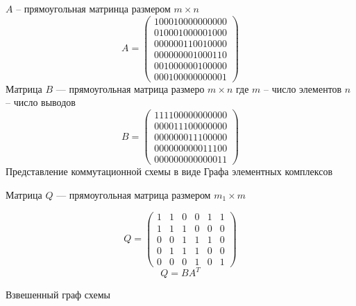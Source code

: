 \documentclass{article}
\begin{document}
	$A$ -- прямоугольная матринца размером $m \times n$
	$$
	A =
	\begin{pmatrix}
		1 0 0 0 1 0 0 0 0 0 0 0 0 0 0\\
		0 1 0 0 0 1 0 0 0 0 0 1 0 0 0\\
		0 0 0 0 0 0 1 1 0 0 1 0 0 0 0\\
		0 0 0 0 0 0 0 0 1 0 0 0 1 1 0\\
		0 0 1 0 0 0 0 0 0 1 0 0 0 0 0\\
		0 0 0 1 0 0 0 0 0 0 0 0 0 0 1
	\end{pmatrix}
	$$
	Матрица $B$ --- прямоугольная матрица размеро $m \times n$ где $m$ -- число элементов $n$ -- число выводов
	$$
	B =
	\begin{pmatrix}
		1 1 1 1 0 0 0 0 0 0 0 0 0 0 0\\
		0 0 0 0 1 1 1 0 0 0 0 0 0 0 0\\
		0 0 0 0 0 0 0 1 1 1 0 0 0 0 0\\
		0 0 0 0 0 0 0 0 0 0 1 1 1 0 0\\
		0 0 0 0 0 0 0 0 0 0 0 0 0 1 1
	\end{pmatrix}
	$$
	Представление коммутационной схемы в виде Графа элементных комплексов

	Матрица $Q$ --- прямоугольная матрица размером $m_1 \times m$

	$$
	Q =
	\begin{pmatrix}
		1 & 1 & 0 & 0 & 1 & 1\\
		1 & 1 & 1 & 0 & 0 & 0\\
		0 & 0 & 1 & 1 & 1 & 0\\
		0 & 1 & 1 & 1 & 0 & 0\\
		0 & 0 & 0 & 1 & 0 & 1
	\end{pmatrix}
	$$
	$$
	Q = B A^T
	$$

	Взвешенный граф схемы
\end{document}
